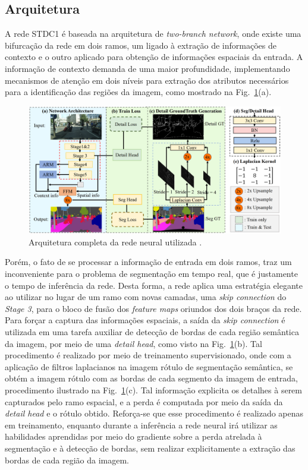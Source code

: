 \documentclass[conference]{IEEEtran}
\begin{document}
\subsection{Arquitetura}

A rede STDC1 \cite{fan2021RethinkingBiSeNetRealtime} é baseada na arquitetura de \textit{two-branch network}, onde existe uma bifurcação da rede em dois ramos, um ligado à extração de informações de contexto e o outro aplicado para obtenção de informações espaciais da entrada. A informação de contexto demanda de uma maior profundidade, implementando mecanismos de atenção em dois níveis para extração dos atributos necessários para a identificação das regiões da imagem, como mostrado na Fig.~\ref{fig:stdcseg-architecture}(a).

\begin{figure}[h!]
	\centering
	\includegraphics[width=1\linewidth]{img/stdcseg-architecture}
	\caption{Arquitetura completa da rede neural utilizada \cite{fan2021RethinkingBiSeNetRealtime}.}
	\label{fig:stdcseg-architecture}
\end{figure}

Porém, o fato de se processar a informação de entrada em dois ramos, traz um inconveniente para o problema de segmentação em tempo real, que é justamente o tempo de inferência da rede. Desta forma, a rede aplica uma estratégia elegante ao utilizar no lugar de um ramo com novas camadas, uma \textit{skip connection} do \textit{Stage 3}, para o bloco de fusão dos \textit{feature maps} oriundos dos dois braços da rede. Para forçar a captura das informações espaciais, a saída da \textit{skip connection} é utilizada em uma tarefa auxiliar de detecção de bordas de cada região semântica da imagem, por meio de uma \textit{detail head}, como visto na Fig.~\ref{fig:stdcseg-architecture}(b). Tal procedimento é realizado por meio de treinamento supervisionado, onde com a aplicação de filtros laplacianos na imagem rótulo de segmentação semântica, se obtém a imagem rótulo com as bordas de cada segmento da imagem de entrada, procedimento ilustrado na Fig.~\ref{fig:stdcseg-architecture}(c). Tal informação explicita os detalhes à serem capturados pelo ramo espacial, e a perda é computada por meio da saída da \textit{detail head} e o rótulo obtido. Reforça-se que esse procedimento é realizado apenas em treinamento, enquanto durante a inferência a rede neural irá utilizar as habilidades aprendidas por meio do gradiente sobre a perda atrelada à segmentação e à detecção de bordas, sem realizar explicitamente a extração das bordas de cada região da imagem.
\end{document}

